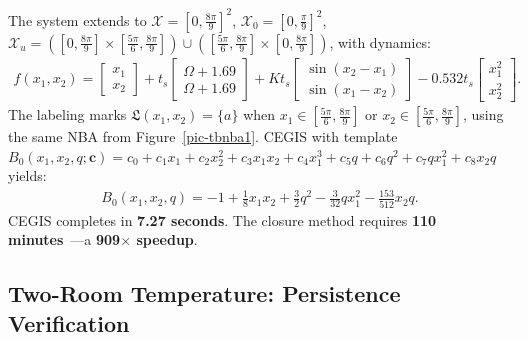 The system extends to $\mathcal{X} = [0, \frac{8\pi}{9}]^2$, $\mathcal{X}_0 = [0, \frac{\pi}{9}]^2$, $\mathcal{X}_u = ([0, \frac{8\pi}{9}] \times [\frac{5\pi}{6}, \frac{8\pi}{9}]) \cup ([\frac{5\pi}{6}, \frac{8\pi}{9}] \times [0, \frac{8\pi}{9}])$, with dynamics:
\begin{align}
f(x_1, x_2) =
\begin{bmatrix} x_1 \\ x_2 \end{bmatrix}
+ t_s
\begin{bmatrix} \Omega + 1.69 \\ \Omega + 1.69 \end{bmatrix}
+ K t_s
\begin{bmatrix} \sin(x_2 - x_1) \\ \sin(x_1 - x_2) \end{bmatrix}
- 0.532 t_s
\begin{bmatrix} x_1^2 \\ x_2^2 \end{bmatrix}.
\end{align}
The labeling marks $\mathfrak{L}(x_1, x_2) = \{a\}$ when $x_1 \in [\frac{5\pi}{6}, \frac{8\pi}{9}]$ or $x_2 \in [\frac{5\pi}{6}, \frac{8\pi}{9}]$, using the same NBA from Figure~\ref{pic-tbnba1}. CEGIS with template $B_{0}(x_1, x_2, q; \mathbf{c}) = c_0 + c_1 x_1 + c_2 x_2^2 + c_3 x_1 x_2 + c_4 x_1^3 + c_5 q + c_6 q^2 + c_7 q x_1^2 + c_8 x_2 q$ yields:
\begin{align}
B_0(x_1, x_2, q) = -1 + \frac{1}{8}x_1 x_2 + \frac{3}{2}q^2 - \frac{3}{32}q x_1^2 - \frac{153}{512}x_2 q.
\end{align}
CEGIS completes in \textbf{7.27 seconds}. The closure method requires \textbf{110 minutes}~\cite{murali2024closure}—a \textbf{909$\times$ speedup}.

\subsection{Two-Room Temperature: Persistence Verification}

